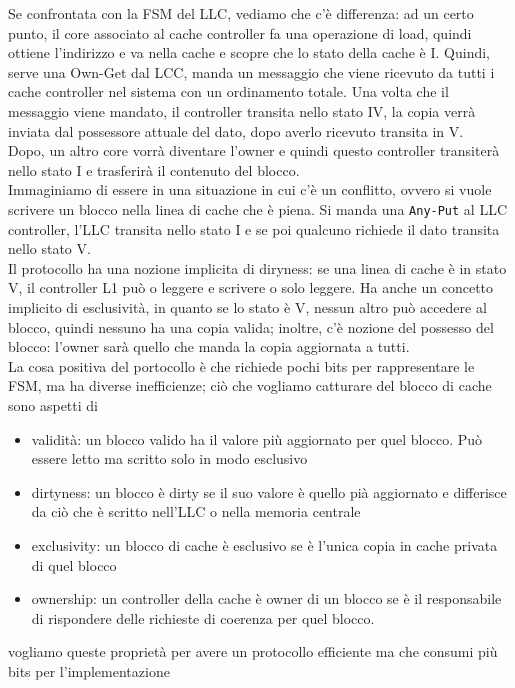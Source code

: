 \documentclass[12pt, oneside]{extbook} %
\begin{document}
Se confrontata con la FSM del LLC, vediamo che c'è differenza: ad un certo punto, il core associato al cache controller fa una operazione di load, quindi ottiene l'indirizzo e va nella cache e scopre che lo stato della cache è I. Quindi, serve una Own-Get dal LCC, manda un messaggio che viene ricevuto da tutti i cache controller nel sistema con un ordinamento totale. Una volta che il messaggio viene mandato, il controller transita nello stato IV, la copia verrà inviata dal possessore attuale del dato, dopo averlo ricevuto transita in V. \\ Dopo, un altro core vorrà diventare l'owner e quindi questo controller transiterà nello stato I e trasferirà il contenuto del blocco.\\ Immaginiamo di essere in una situazione in cui c'è un conflitto, ovvero si vuole scrivere un blocco nella linea di cache che è piena. Si manda una \texttt{Any-Put} al LLC controller, l'LLC transita nello stato I e se poi qualcuno richiede il dato transita nello stato V.\\ Il protocollo ha una nozione implicita di diryness: se una linea di cache è in stato V, il controller L1 può o leggere e scrivere o solo leggere. Ha anche un concetto implicito di esclusività, in quanto se lo stato è V, nessun altro può accedere al blocco, quindi nessuno ha una copia valida; inoltre, c'è nozione del possesso del blocco: l'owner sarà quello che manda la copia aggiornata a tutti.\\ La cosa positiva del portocollo è che richiede pochi bits per rappresentare le FSM, ma ha diverse inefficienze; ciò che vogliamo catturare del blocco di cache sono aspetti di
\begin{itemize}
\item validità: un blocco valido ha il valore più aggiornato per quel blocco. Può essere letto ma scritto solo in modo esclusivo
\item dirtyness: un blocco è dirty se il suo valore è quello pià aggiornato e differisce da ciò che è scritto nell'LLC o nella memoria centrale
\item exclusivity: un blocco di cache è esclusivo se è l'unica copia in cache privata di quel blocco
\item ownership: un controller della cache è owner di un blocco se è il responsabile di rispondere delle richieste di coerenza per quel blocco.
\end{itemize}
vogliamo queste proprietà per avere un protocollo efficiente ma che consumi più bits per l'implementazione
\end{document}
